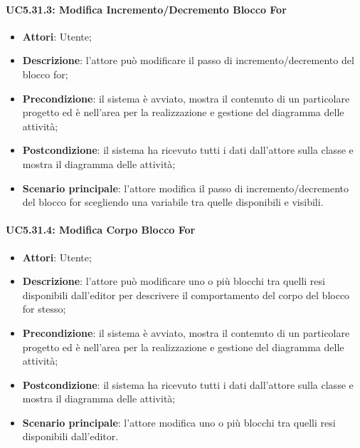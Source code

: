 \paragraph{UC5.31.3: Modifica Incremento/Decremento Blocco For}
\label{UC5.31.3}
\begin{itemize}
	\item \textbf{Attori}: Utente;
	\item \textbf{Descrizione}: l'attore può modificare il passo di incremento/decremento del blocco for;
	\item \textbf{Precondizione}: il sistema è avviato, mostra il contenuto di un particolare progetto ed è nell'area per la realizzazione e gestione del diagramma delle attività;
	\item \textbf{Postcondizione}: il sistema ha ricevuto tutti i dati dall'attore sulla classe e mostra il diagramma delle attività;
	\item \textbf{Scenario principale}: l'attore modifica il passo di incremento/decremento del blocco for scegliendo una variabile tra quelle disponibili e visibili.
\end{itemize}

\paragraph{UC5.31.4: Modifica Corpo Blocco For}
\label{UC5.31.4}
\begin{itemize}
	\item \textbf{Attori}: Utente;
	\item \textbf{Descrizione}: l'attore può modificare uno o più blocchi tra quelli resi disponibili dall'editor per descrivere il comportamento del corpo del blocco for stesso;
	\item \textbf{Precondizione}: il sistema è avviato, mostra il contenuto di un particolare progetto ed è nell'area per la realizzazione e gestione del diagramma delle attività;
	\item \textbf{Postcondizione}: il sistema ha ricevuto tutti i dati dall'attore sulla classe e mostra il diagramma delle attività;
	\item \textbf{Scenario principale}: l'attore modifica uno o più blocchi tra quelli resi disponibili dall'editor.
\end{itemize}

